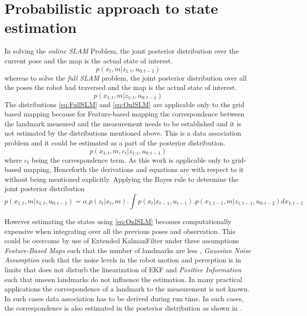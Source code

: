 \section{Probabilistic approach to state estimation}
    In solving the \textit{online SLAM} Problem, the joint posterior distribution over the current pose and the map is the actual state of interest.
\begin{equation} \label{eq:OnlSLM}
    p(x_t, m | z_{1:t}, u_{0:t-1})
\end{equation}
whereas to solve the \textit{full SLAM }problem, the joint posterior distribution over  all the poses the robot had traversed and the map is the actual state of interest.
\begin{equation} \label{eq:FullSLM}
    p(x_{1:t}, m | z_{1:t}, u_{0:t-1})
\end{equation}
The distributions \ref{eq:FullSLM} and \ref{eq:OnlSLM} are applicable only to the grid based mapping because for Feature-based mapping the correspondence between the landmark measured and the measurement needs to be established and it is not estimated by the distributions mentioned above. This is a data association problem and it could be estimated as a part of the posterior distribution.
\begin{equation} \label{CorresSLM}
    p(x_{1:t}, m, c_t | z_{1:t}, u_{0:t-1})
\end{equation}
where $c_t$ being the correspondence term. As this work is applicable only to grid-based mapping, Henceforth the derivations and equations are with respect to it without being mentioned explicitly.
Applying the Bayes rule to determine the joint posterior distribution 
\begin{equation} \label{eq:FullSLMc}
    p(x_{1:t}, m | z_{1:t}, u_{0:t-1}) = \alpha . p(z_t | x_t, m).\int p(x_t| x_{t-1}, u_{t-1}). p(x_{1:t-1}, m | z_{1:t-1}, u_{0:t-2}) dx_{1:t-1}
\end{equation}
\par

However estimating the states using \ref{eq:OnlSLM} becomes computationally expensive when integrating over all the previous poses and observation. This could be overcome by use of Extended KalmanFilter under three assumptions \textit{Feature-Based Maps} such that the number of landmarks are less , \textit{Gaussian Noise Assumption} such that the noise levels in the robot motion and perception is in limits that does not disturb the linearization of EKF and \textit{ Positive Information} such that unseen landmarks do not influence the estimation. In many practical applications the correspondence of a landmark to the measurement is not known. In such cases data association has to be derived during run time. In such cases, the correspondence is also estimated in the posterior distribution as shown in .

